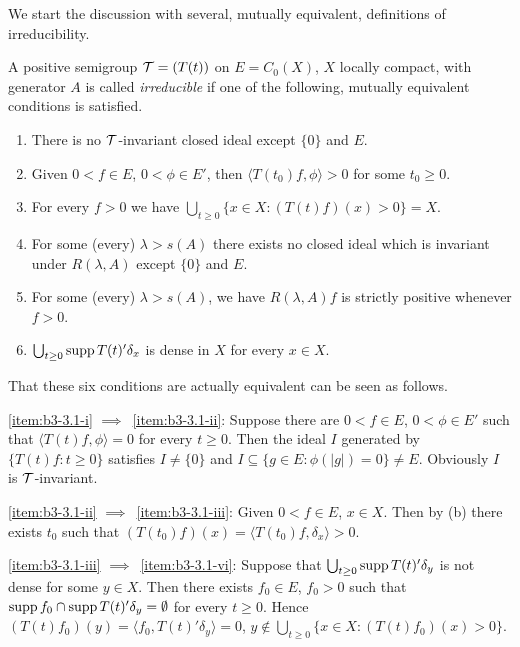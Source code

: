 We start the discussion with several, mutually equivalent, definitions of irreducibility. 
\begin{definition}\label{def:b3-3.1}
A positive semigroup $\mathcal{T} = (T(t))$ on $E = C_{0}(X)$, $X$ locally compact, with generator $A$ is called \emph{irreducible} if one of the following, mutually equivalent conditions is satisfied.
\begin{enumerate}[\upshape (a)]

\item\label{item:b3-3.1-i}
There is no $\mathcal{T}$-invariant closed ideal except $\{0\}$ and $E$.
	
\item\label{item:b3-3.1-ii}
Given $0 < f \in E$, $0 < \phi \in E'$, then $\langle T(t_{0})f,\phi \rangle > 0$ for some $t_{0} \geq 0$.
	
\item\label{item:b3-3.1-iii}
For every $f > 0$ we have 
$\bigcup_{t \geq 0}\{x \in X \colon (T(t)f)(x) > 0\} = X$.
	
\item\label{item:b3-3.1-iv}
For some (every) $\lambda > s(A)$ there exists no closed ideal which is invariant under $R(\lambda,A)$ except $\{0\}$ and $E$.
	
\item\label{item:b3-3.1-v}
For some (every) $\lambda > s(A)$, we have $R(\lambda,A)f$ is strictly positive whenever $f > 0$.
	
\item\label{item:b3-3.1-vi}
$\bigcup_{t \geq 0}\supp T(t)'\delta_{x}$ is dense in $X$ for every $x \in X$.

\end{enumerate}
\end{definition}
That these six conditions are actually equivalent can be seen as follows.

\ref{item:b3-3.1-i} $\implies$~\ref{item:b3-3.1-ii}: Suppose there are $0 < f \in E$, $0 < \phi \in E'$ such that $\langle T(t)f,\phi \rangle = 0$ for every $t \geq 0$.
Then the ideal $I$ generated by $\{T(t)f \colon t \geq 0\}$ satisfies $I \neq \{0\}$ and $I \subseteq \{g \in E \colon \phi(|g|) = 0\} \neq E$.
Obviously $I$ is $\mathcal{T}$-invariant.

\ref{item:b3-3.1-ii} $\implies$~\ref{item:b3-3.1-iii}: Given $0 < f \in E$, $x \in X$.
Then by (b) there exists $t_{0}$ such that $(T(t_{0})f)(x) = \langle T(t_{0})f,\delta_{x} \rangle > 0$.

\ref{item:b3-3.1-iii} $\implies$~\ref{item:b3-3.1-vi}: Suppose that $\bigcup_{t \geq 0}\supp T(t)'\delta_{y}$ is not dense for some $y \in X$.
Then there exists $f_{0} \in E$, $f_{0} > 0$ such that
$\mathop{}\!\mathrm{supp}\, f_{0} \cap \mathop{}\!\mathrm{supp}\, T(t)'\delta_{y} = \emptyset$ for every $t \geq 0$.
Hence $(T(t)f_{0})(y) = \langle f_{0},T(t)'\delta_{y} \rangle = 0$, \ie $y \notin \bigcup_{t\geq 0}\{x \in X \colon (T(t)f_{0})(x) > 0\}$.

